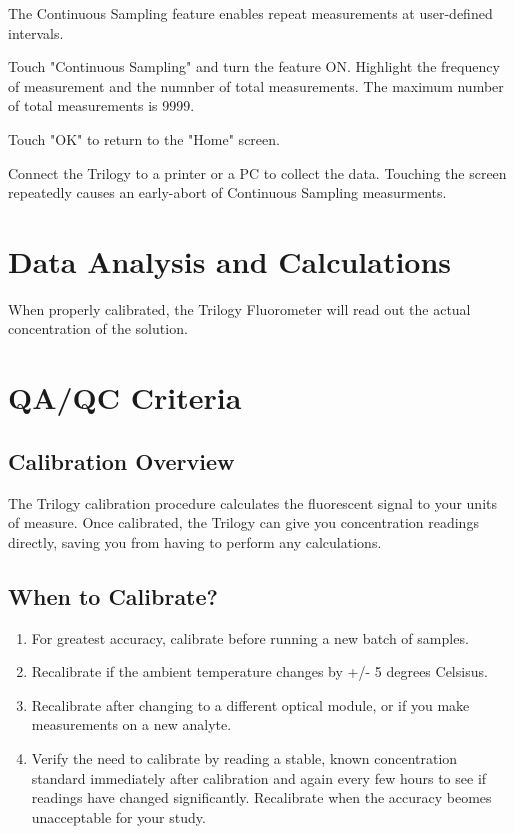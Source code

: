 \documentclass[12pt]{../SOP4_alpha}\usepackage[]{graphicx}\usepackage[]{color}
\begin{document}
\NP The Continuous Sampling feature enables repeat measurements at user-defined intervals.

\NP Touch "Continuous Sampling" and turn the feature ON. Highlight the frequency of measurement and the numnber of total measurements. The maximum number of total measurements is 9999.

\NP Touch "OK" to return to the "Home" screen.

\NP Connect the Trilogy to a printer or a PC to collect the data. Touching the screen repeatedly causes an early-abort of Continuous Sampling measurments. 


\section{Data Analysis and Calculations}

\NP When properly calibrated, the Trilogy Fluorometer will read out the actual concentration of the solution.

\section{QA/QC Criteria}

\subsection{Calibration Overview}

\NP The Trilogy calibration procedure calculates the fluorescent signal to your units of measure. Once calibrated, the Trilogy can give you concentration readings directly, saving you from having to perform any calculations. 

\subsection{When to Calibrate?}

\begin{enumerate}
  \item For greatest accuracy, calibrate before running a new batch of samples.
  \item Recalibrate if the ambient temperature changes by +/- 5 degrees Celsisus.
  \item Recalibrate after changing to a different optical module, or if you make measurements on a new analyte. 
  \item Verify the need to calibrate by reading a stable, known concentration standard immediately after calibration and again every few hours to see if readings have changed significantly. Recalibrate when the accuracy beomes unacceptable for your study.
\end{enumerate}
\end{document}
